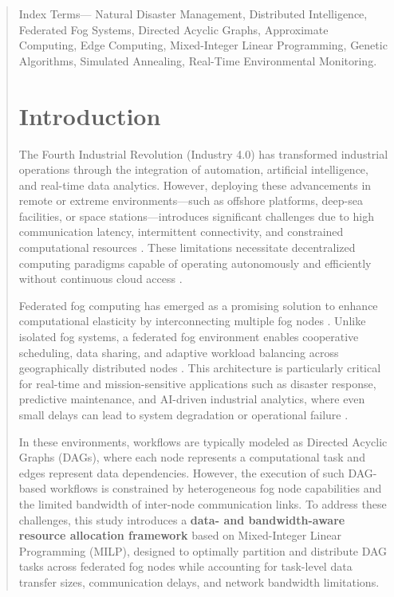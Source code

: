 \documentclass[conference]{IEEEtran}
\begin{document}
\begin{abstract}
Index Terms— Natural Disaster Management, Distributed Intelligence, Federated Fog Systems, Directed Acyclic Graphs, Approximate Computing, Edge Computing, Mixed-Integer Linear Programming, Genetic Algorithms, Simulated Annealing, Real-Time Environmental Monitoring.

\section{Introduction}

The Fourth Industrial Revolution (Industry 4.0) has transformed industrial operations through the integration of automation, artificial intelligence, and real-time data analytics. However, deploying these advancements in remote or extreme environments—such as offshore platforms, deep-sea facilities, or space stations—introduces significant challenges due to high communication latency, intermittent connectivity, and constrained computational resources \cite{wang2021adaptive}. These limitations necessitate decentralized computing paradigms capable of operating autonomously and efficiently without continuous cloud access \cite{dragoni2017microservices}.

Federated fog computing has emerged as a promising solution to enhance computational elasticity by interconnecting multiple fog nodes \cite{mattia2023fogcontrol}. Unlike isolated fog systems, a federated fog environment enables cooperative scheduling, data sharing, and adaptive workload balancing across geographically distributed nodes \cite{provisioning2023}. This architecture is particularly critical for real-time and mission-sensitive applications such as disaster response, predictive maintenance, and AI-driven industrial analytics, where even small delays can lead to system degradation or operational failure \cite{fgcs2024}.

In these environments, workflows are typically modeled as Directed Acyclic Graphs (DAGs), where each node represents a computational task and edges represent data dependencies. However, the execution of such DAG-based workflows is constrained by heterogeneous fog node capabilities and the limited bandwidth of inter-node communication links. To address these challenges, this study introduces a \textbf{data- and bandwidth-aware resource allocation framework} based on Mixed-Integer Linear Programming (MILP), designed to optimally partition and distribute DAG tasks across federated fog nodes while accounting for task-level data transfer sizes, communication delays, and network bandwidth limitations.


\end{abstract}
\end{document}
